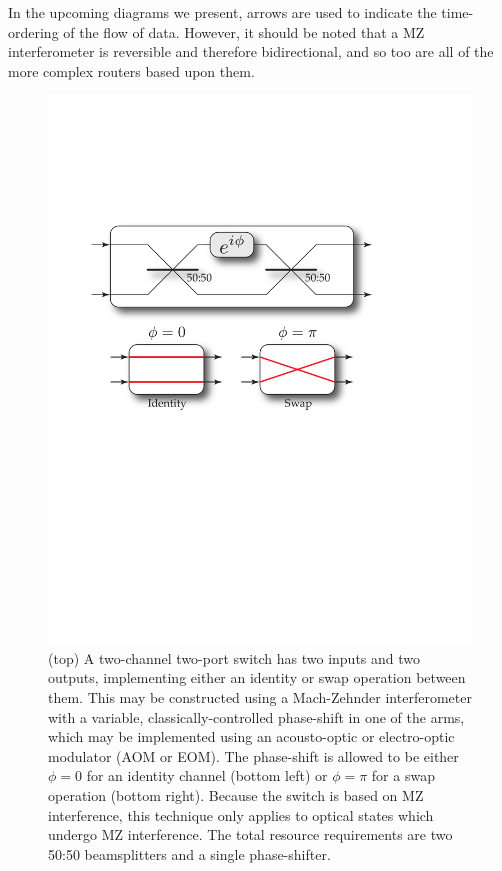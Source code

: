 \documentclass[aps,rmp,twocolumn,amsmath,amssymb,nofootinbib,superscriptaddress,longbibliography,floatfix,table-of-contents,eqsecnum]{revtex4-1}
\begin{document}
In the upcoming diagrams we present, arrows are used to indicate the time-ordering of the flow of data. However, it should be noted that a MZ interferometer is reversible and therefore bidirectional, and so too are all of the more complex routers based upon them.

\begin{figure}[!htb]
\includegraphics[width=\columnwidth]{two_channel_two_port_switch}
\caption{(top) A two-channel two-port switch has two inputs and two outputs, implementing either an identity or swap operation between them. This may be constructed using a Mach-Zehnder interferometer with a variable, classically-controlled phase-shift in one of the arms, which may be implemented using an acousto-optic or electro-optic modulator (AOM or EOM). The phase-shift is allowed to be either \mbox{$\phi=0$} for an identity channel (bottom left) or \mbox{$\phi=\pi$} for a swap operation (bottom right). Because the switch is based on MZ interference, this technique only applies to optical states which undergo MZ interference. The total resource requirements are two 50:50 beamsplitters and a single phase-shifter.} \label{fig:two_channel_two_port_switch} 
\end{figure}
\end{document}
